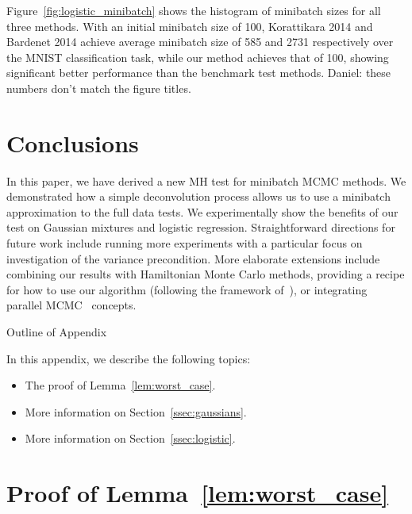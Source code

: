 \documentclass{article}
\begin{document}
Figure~\ref{fig:logistic_minibatch} shows the histogram of minibatch sizes for
all three methods. With an initial minibatch size of 100, Korattikara 2014 and
Bardenet 2014 achieve average minibatch size of 585 and 2731 respectively over
the MNIST classification task, while our method achieves that of 100, showing
significant better performance than the benchmark test methods. {\color{blue}
Daniel: these numbers don't match the figure titles.}


\section{Conclusions}\label{sec:conclusion}

In this paper, we have derived a new MH test for minibatch MCMC methods. We demonstrated how a
simple deconvolution process allows us to use a minibatch approximation to the full data tests. We
experimentally show the benefits of our test on Gaussian mixtures and logistic regression.
Straightforward directions for future work include running more experiments with a
particular focus on investigation of the variance precondition.  More elaborate extensions include
combining our results with Hamiltonian Monte Carlo methods, providing a recipe for how to use our
algorithm (following the framework of~\cite{sgmcmc_2015}), or integrating parallel
MCMC~\cite{conf/uai/AngelinoKWSA14,conf/icml/AhnSW14} concepts.


\small


\normalsize

\clearpage
\appendix

\begin{center}
{\Large Outline of Appendix}
\end{center}

In this appendix, we describe the following topics:

\begin{itemize}[noitemsep]
    \item The proof of Lemma~\ref{lem:worst_case}.
    \item More information on Section~\ref{ssec:gaussians}.
    \item More information on Section~\ref{ssec:logistic}.
\end{itemize}

\section{Proof of Lemma~\ref{lem:worst_case}}\label{app:worst_case_proof}
\end{document}
